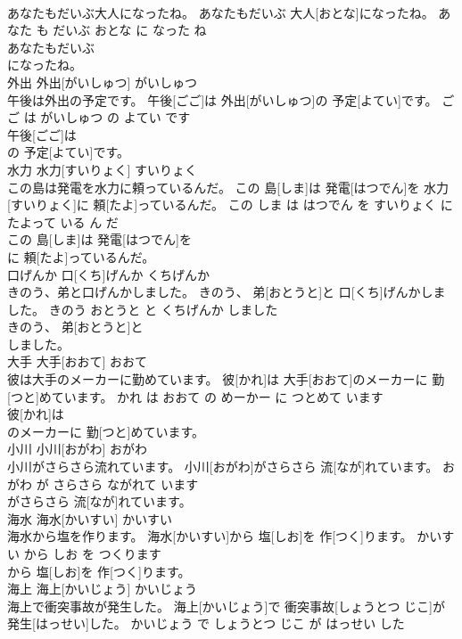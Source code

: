 \documentclass[8pt]{extreport}
\begin{document}
\begin{CJK}{UTF8}{min}
\\	あなたもだいぶ大人になったね。	あなたもだいぶ 大人[おとな]になったね。	あなた も だいぶ おとな に なった ね	
\\	あなたもだいぶ
\\	になったね。			
\\	外出	外出[がいしゅつ]	がいしゅつ	
\\	午後は外出の予定です。	午後[ごご]は 外出[がいしゅつ]の 予定[よてい]です。	ごご は がいしゅつ の よてい です	
\\	午後[ごご]は
\\	の 予定[よてい]です。			
\\	水力	水力[すいりょく]	すいりょく	
\\	この島は発電を水力に頼っているんだ。	この 島[しま]は 発電[はつでん]を 水力[すいりょく]に 頼[たよ]っているんだ。	この しま は はつでん を すいりょく に たよって いる ん だ	
\\	この 島[しま]は 発電[はつでん]を
\\	に 頼[たよ]っているんだ。			
\\	口げんか	口[くち]げんか	くちげんか	
\\	きのう、弟と口げんかしました。	きのう、 弟[おとうと]と 口[くち]げんかしました。	きのう おとうと と くちげんか しました	
\\	きのう、 弟[おとうと]と
\\	しました。			
\\	大手	大手[おおて]	おおて	
\\	彼は大手のメーカーに勤めています。	彼[かれ]は 大手[おおて]のメーカーに 勤[つと]めています。	かれ は おおて の めーかー に つとめて います	
\\	彼[かれ]は
\\	のメーカーに 勤[つと]めています。			
\\	小川	小川[おがわ]	おがわ	
\\	小川がさらさら流れています。	小川[おがわ]がさらさら 流[なが]れています。	おがわ が さらさら ながれて います	
\\	がさらさら 流[なが]れています。			
\\	海水	海水[かいすい]	かいすい	
\\	海水から塩を作ります。	海水[かいすい]から 塩[しお]を 作[つく]ります。	かいすい から しお を つくります	
\\	から 塩[しお]を 作[つく]ります。			
\\	海上	海上[かいじょう]	かいじょう	
\\	海上で衝突事故が発生した。	海上[かいじょう]で 衝突事故[しょうとつ じこ]が 発生[はっせい]した。	かいじょう で しょうとつ じこ が はっせい した	

\end{CJK}
\end{document}

